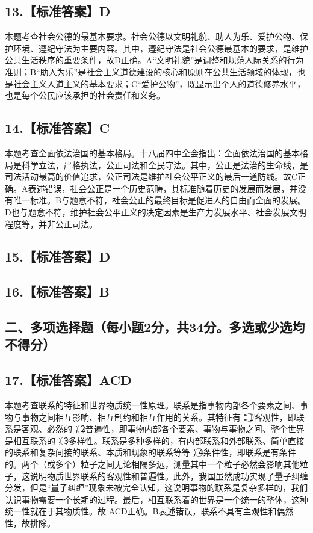 \documentclass[UTF8,11pt]{ctexart}
\begin{document}
\subsection*{13.【标准答案】D}

本题考查社会公德的最基本要求。社会公德以文明礼貌、助人为乐、爱护公物、保护环境、遵纪守法为主要内容。其中，遵纪守法是社会公德最基本的要求，是维护公共生活秩序的重要条件，故D正确。A“文明礼貌”是调整和规范人际关系的行为准则；B“助人为乐”是社会主义道德建设的核心和原则在公共生活领域的体现，也是社会主义人道主义的基本要求；C“爱护公物”，既显示出个人的道德修养水平，也是每个公民应该承担的社会责任和义务。


\subsection*{14.【标准答案】C}

本题考查全面依法治国的基本格局。十八届四中全会指出：全面依法治国的基本格局是科学立法，严格执法，公正司法和全民守法。其中，公正是法治的生命线，是司法活动最高的价值追求，公正司法是维护社会公平正义的最后一道防线。故C正确。A表述错误，社会公正是一个历史范畴，其标准随着历史的发展而发展，并没有唯一标准。B与题意不符，社会公正的最终目标是促进人的自由而全面的发展。D也与题意不符，维护社会公平正义的决定因素是生产力发展水平、社会发展文明程度等，并非公正司法。


\subsection*{15.【标准答案】D}

\subsection*{16.【标准答案】B}

\subsection*{二、多项选择题（每小题2分，共34分。多选或少选均不得分）}

\subsection*{17.【标准答案】ACD}

本题考查联系的特征和世界物质统一性原理。联系是指事物内部各个要素之间、事物与事物之间相互影响、相互制约和相互作用的关系。其特征有：\textcircled{1}客观性，即联系是客观、必然的；\textcircled{2}普遍性，即事物内部各个要素、事物与事物之间、整个世界是相互联系的；\textcircled{3}多样性。联系是多种多样的，有内部联系和外部联系、简单直接的联系和复杂间接的联系、本质和现象的联系等等；\textcircled{4}条件性，即联系是有条件的。两个（或多个）粒子之间无论相隔多远，测量其中一个粒子必然会影响其他粒子，这说明物质世界联系的客观性和普遍性。此外，我国虽然成功实现了量子纠缠分发，但是“量子纠缠”现象未被完全认知，这说明事物的联系是复杂多样的，我们认识事物需要一个长期的过程。最后，相互联系着的世界是一个统一的整体，这种统一性就在于其物质性。故 ACD正确。B表述错误，联系不具有主观性和偶然性，故排除。
\end{document}
